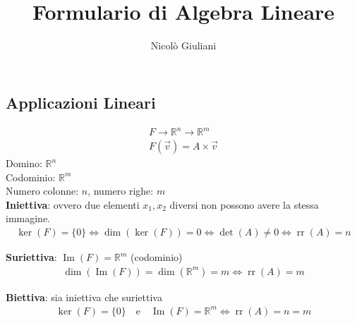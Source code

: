 \documentclass{article}
\title{Formulario di Algebra Lineare}
\author{Nicolò Giuliani}
\date{}
\begin{document}
\maketitle
\subsection*{Applicazioni Lineari}
\begin{align}
    F \to \mathbb{R}^n \to \mathbb{R}^m \\
    F(\vec{v})=A\times\vec{v}
\end{align}
Domino: $\mathbb{R}^n$ \\
Codominio: $\mathbb{R}^m$ \\
Numero colonne: $n$, numero righe: $m$ \\
\textbf{Iniettiva}: ovvero due elementi \( x_1, x_2 \) diversi non possono avere la stessa immagine.
\begin{align*}
    \ker(F) = \{0\} \iff \dim(\ker(F)) = 0 \iff \det(A) \neq 0 \iff \operatorname{rr}(A) = n
\end{align*}

\textbf{Suriettiva}: \( \operatorname{Im}(F) = \mathbb{R}^m \) (codominio)
\begin{align*}
    \dim(\operatorname{Im}(F)) = \dim(\mathbb{R}^m) = m \iff \operatorname{rr}(A) = m
\end{align*}

\textbf{Biettiva}: sia iniettiva che suriettiva
\begin{align*}
    \ker(F) = \{0\} \quad \text{e} \quad \operatorname{Im}(F) = \mathbb{R}^m \iff \operatorname{rr}(A) = n = m
\end{align*}
\end{document}
